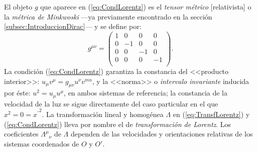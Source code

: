 El objeto $g$ que aparece en (\ref{eq:CondLorentz}) es el \textit{tensor métrico} [relativista] o la \textit{métrica de Minkwoski} ---ya previamente encontrado en la sección \ref{subsec:IntroduccionDirac}--- y se define por:
\begin{equation}\label{eq:Metrica} 
g^{\mu\nu}=	\begin{pmatrix}
			1 & 0 & 0 & 0 \\
			0 & -1 & 0 & 0 \\
			0 & 0 & -1 & 0 \\
			0 & 0 & 0 & -1 \\
			\end{pmatrix}.
\end{equation}
La condición (\ref{eq:CondLorentz}) garantiza la constancia del <<producto interior>>: $u_{\mu}v^{\mu}=g_{\mu\nu}u^{\nu}v^{mu}$, y la <<norma>> o \textit{intervalo invariante} inducida por éste: $u^2=u_\mu u^\mu$, en ambos sistemas de referencia; la constancia de la velocidad de la luz se sigue directamente del caso particular en el que $x^2=0={x^\prime}^2$. La transformación lineal y homogénea $\Lambda$ en (\ref{eq:TransfLorentz}) y (\ref{eq:CondLorentz}) lleva por nombre el de  \textit{transformación de Lorentz}. Los coeficientes $\Lambda^{\mu}{}_{\nu}$ de $\Lambda$ dependen de las velocidades y orientaciones relativas de los sistemas coordenados de $O$ y $O'$. 

